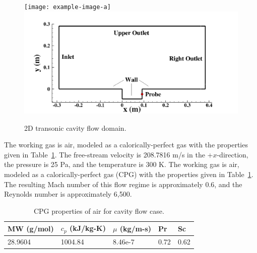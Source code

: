 \begin{figure}
    \centering
	\ifdefined\DRAFT
		\texttt{[image: example-image-a]}
	\else
    	\includegraphics[width=0.9\linewidth]{Chapters/CavityAndCVRC/Images/cavity/geom.png}
	\fi
    \caption{\label{fig:cavityGeom} 2D transonic cavity flow domain.}
\end{figure}

The working gas is air, modeled as a calorically-perfect gas with the properties given in Table~\ref{tab:airProps}. The free-stream velocity is 208.7816 m/s in the +$x$-direction, the pressure is 25 Pa, and the temperature is 300 K. The working gas is air, modeled as a calorically-perfect gas (CPG) with the properties given in Table~\ref{tab:airProps}. The resulting Mach number of this flow regime is approximately 0.6, and the Reynolds number is approximately 6,500.

\begin{table}
	\centering
	\begin{tabular}{ lllll }
	\toprule
	MW (g/mol) & $c_p$ (kJ/kg-K) & $\mu$ (kg/m-s) & Pr & Sc   \\
	\midrule
	28.9604 & 1004.84 & 8.46e-7 & 0.72 & 0.62 \\
	\bottomrule
	\end{tabular}
	\caption{\label{tab:airProps}CPG properties of air for cavity flow case.}
\end{table}

